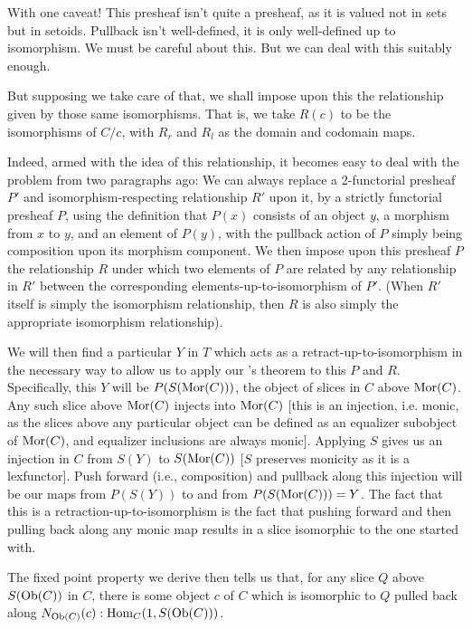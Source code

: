 With one caveat! This presheaf isn't quite a presheaf, as it is valued not in sets but in setoids. Pullback isn't well-defined, it is only well-defined up to isomorphism. We must be careful about this. But we can deal with this suitably enough.

But supposing we take care of that, we shall impose upon this the relationship given by those same isomorphisms. That is, we take $R(c)$ to be the isomorphisms of $C/c$, with $R_r$ and $R_l$ as the domain and codomain maps.

Indeed, armed with the idea of this relationship, it becomes easy to deal with the problem from two paragraphs ago: We can always replace a 2-functorial presheaf $P'$ and isomorphism-respecting relationship $R'$ upon it, by a strictly functorial presheaf $P$, using the definition that $P(x)$ consists of an object $y$, a morphism from $x$ to $y$, and an element of $P(y)$, with the pullback action of $P$ simply being composition upon its morphism component. We then impose upon this presheaf $P$ the relationship $R$ under which two elements of $P$ are related by any relationship in $R'$ between the corresponding elements-up-to-isomorphism of $P'$. (When $R'$ itself is simply the isomorphism relationship, then $R$ is also simply the appropriate isomorphism relationship). 

We will then find a particular $Y$ in $T$ which acts as a retract-up-to-isomorphism in the necessary way to allow us to apply our \Loeb's theorem to this $P$ and $R$. Specifically, this $Y$ will be $P(S(\operatorname{Mor}(C)))$, the object of slices in $C$ above $\operatorname{Mor}(C)$. Any such slice above $\operatorname{Mor}(C)$ injects into $\operatorname{Mor}(C)$ [this is an injection, i.e. monic, as the slices above any particular object can be defined as an equalizer subobject of $\operatorname{Mor}(C)$, and equalizer inclusions are always monic]. Applying $S$ gives us an injection in $C$ from $S(Y)$ to $S(\operatorname{Mor}(C))$ [$S$ preserves monicity as it is a lexfunctor]. Push forward (i.e., composition) and pullback along this injection will be our maps from $P(S(Y))$ to and from $P(S(\operatorname{Mor}(C))) = Y$. The fact that this is a retraction-up-to-isomorphism is the fact that pushing forward and then pulling back along any monic map results in a slice isomorphic to the one started with. 

The fixed point property we derive then tells us that, for any slice $Q$ above $S(\operatorname{Ob}(C))$ in $C$, there is some object $c$ of $C$ which is isomorphic to $Q$ pulled back along $N_{\operatorname{Ob}(C)}(c) : \operatorname{Hom}_C(1, S(\operatorname{Ob}(C)))$.

